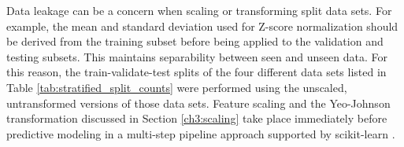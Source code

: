 Data leakage can be a concern when scaling or transforming split data sets. For example, the mean and standard deviation used for Z-score normalization should be derived from the training subset before being applied to the validation and testing subsets. This maintains separability between seen and unseen data. For this reason, the train-validate-test splits of the four different data sets listed in Table \ref{tab:stratified_split_counts} were performed using the unscaled, untransformed versions of those data sets. Feature scaling and the Yeo-Johnson transformation discussed in Section \ref{ch3:scaling} take place immediately before predictive modeling in a multi-step pipeline approach supported by scikit-learn \citep[see][]{scikit-learn_pipelines_2021}.
\\
\begin{table}%
\end{table}
